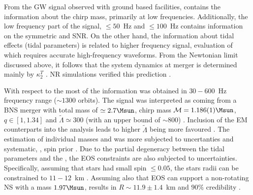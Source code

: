 From the \ac{GW} signal observed with ground based facilities, contains the information 
about the chirp mass, 
primarily at low frequencies. Additionally, the low frequency part of the signal, 
$\leq50$~Hz and $\leq100$~Hz contains information on the symmetric \mr{} and \ac{SNR}.
On the other hand, the information about tidal effects (tidal parameters) is related to 
higher frequency signal, evaluation of which requires accurate high-frequency waveforms.
%
From the Newtonian limit discussed above, it follows that the system dynamics at merger 
is determined mainly by $\kappa_2^T$ \cite{Bernuzzi:2014owa}. \ac{NR} simulations verified this 
prediction \cite{Zappa:2017xba,Breschi:2019srl}. 

With respect to the \GW{} most of the information was obtained in $30-600$~Hz frequency 
range ($\sim 1300$ orbits).
The signal was interpreted as coming from a \ac{BNS} merger with total mass of $\simeq2.7\Msun$,
chirp mass $\mathcal{M}=1.186(1)\Msun$, \mr{} $q\in[1,1.34]$ and $\tilde{\Lambda}\simeq 300$ 
(with an upper bound of $\sim800$) \cite{TheLIGOScientific:2017qsa,Abbott:2018wiz,LIGOScientific:2018mvr}.
Inclusion of the \ac{EM} counterparts into the analysis leads to higher $\tilde{\Lambda}$ being 
more favoured \cite{Radice:2017lry,Radice:2018ozg}.
%
The estimation of individual masses and \mr{} was more subjected to uncertanties and 
systematic, \ie, spin prior \cite{2}. Due to the partial degeneracy between the tidal 
parameters and the \mr{}, the \ac{EOS} constraints are also subjected to uncertainties. 
Specifically, assuming that stars had small spin $\leq 0.05$, the stars radii can be 
constrained to $11-12$~km \cite{De:2018uhw,Abbott:2018exr}. 
Assuming also that \ac{EOS} can support a non-rotating \ac{NS} with a mass $1.97\Msun$, 
results in  $R\sim 11.9\pm 1.4$~km and $90\%$ credibility \cite{Abbott:2018exr}.
%
%


